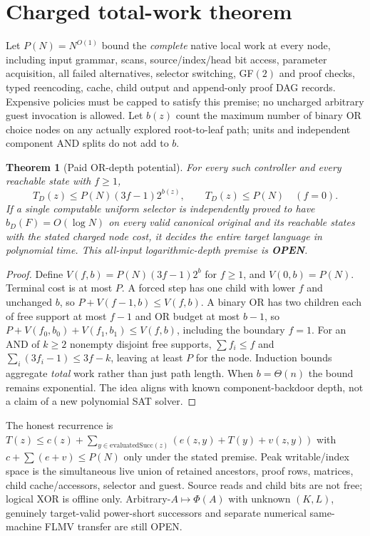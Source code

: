 \documentclass[11pt]{article}
\newtheorem{theorem}{Theorem}
\begin{document}
\section{Charged total-work theorem}
Let $P(N)=N^{O(1)}$ bound the \emph{complete} native local work at every node, including input grammar, scans, source/index/head bit access, parameter acquisition, all failed alternatives, selector switching, GF$(2)$ and proof checks, typed reencoding, cache, child output and append-only proof DAG records. Expensive policies must be capped to satisfy this premise; no uncharged arbitrary guest invocation is allowed. Let $b(z)$ count the maximum number of binary OR choice nodes on any actually explored root-to-leaf path; units and independent component AND splits do not add to $b$.
\begin{theorem}[Paid OR-depth potential]
For every such controller and every reachable state with $f\ge1$,
\[
\boxed{T_D(z)\le P(N)(3f-1)2^{b(z)}},
\qquad T_D(z)\le P(N)\quad(f=0).
\]
If a single computable uniform selector is independently proved to have $b_D(F)=O(\log N)$ on \emph{every} valid canonical original and its reachable states with the stated charged node cost, it decides the entire target language in polynomial time. This all-input logarithmic-depth premise is \textbf{OPEN}.
\end{theorem}
\begin{proof}
Define $V(f,b)=P(N)(3f-1)2^b$ for $f\ge1$, and $V(0,b)=P(N)$. Terminal cost is at most $P$. A forced step has one child with lower $f$ and unchanged $b$, so $P+V(f-1,b)\le V(f,b)$. A binary OR has two children each of free support at most $f-1$ and OR budget at most $b-1$, so $P+V(f_0,b_0)+V(f_1,b_1)\le V(f,b)$, including the boundary $f=1$. For an AND of $k\ge2$ nonempty disjoint free supports, $\sum f_i\le f$ and $\sum_i(3f_i-1)\le3f-k$, leaving at least $P$ for the node. Induction bounds aggregate \emph{total} work rather than just path length. When $b=\Theta(n)$ the bound remains exponential. The idea aligns with known component-backdoor depth, not a claim of a new polynomial SAT solver.
\end{proof}
The honest recurrence is $T(z)\le c(z)+\sum_{y\in\mathrm{evaluatedSucc}(z)}(e(z,y)+T(y)+v(z,y))$ with $c+\sum(e+v)\le P(N)$ only under the stated premise. Peak writable/index space is the simultaneous live union of retained ancestors, proof rows, matrices, child cache/accessors, selector and guest. Source reads and child bits are not free; logical XOR is offline only. Arbitrary-$A\mapsto\Phi(A)$ with unknown $(K,L)$, genuinely target-valid power-short successors and separate numerical same-machine FLMV transfer are still OPEN.
\end{document}
